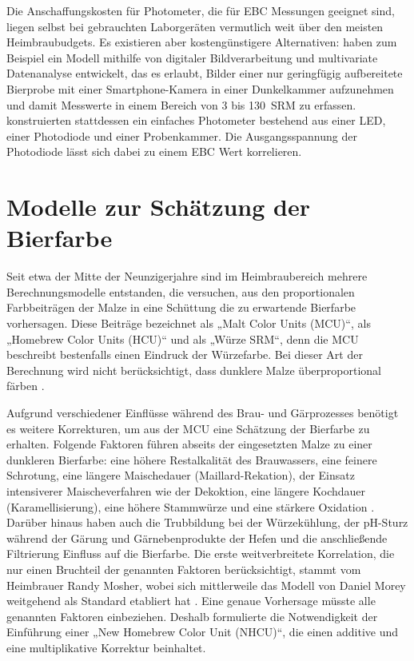 \documentclass[a4paper,parskip=half]{scrartcl}
\begin{document}
Die Anschaffungskosten für Photometer, die für EBC Messungen geeignet sind, liegen selbst bei gebrauchten Laborgeräten vermutlich weit über den meisten Heimbraubudgets. Es existieren aber kostengünstigere Alternativen: \textcite{Fulgencio2019} haben zum Beispiel ein Modell mithilfe von digitaler Bildverarbeitung und multivariate Datenanalyse entwickelt, das es erlaubt, Bilder einer nur geringfügig aufbereitete Bierprobe mit einer Smartphone-Kamera in einer Dunkelkammer aufzunehmen und damit Messwerte in einem Bereich von 3 bis 130~SRM zu erfassen. \textcite{Caro2019} konstruierten stattdessen ein einfaches Photometer bestehend aus einer LED, einer Photodiode und einer Probenkammer. Die Ausgangsspannung der Photodiode lässt sich dabei zu einem EBC Wert korrelieren.

\section*{Modelle zur Schätzung der Bierfarbe}

Seit etwa der Mitte der Neunzigerjahre sind im Heimbraubereich mehrere Berechnungsmodelle entstanden, die versuchen, aus den proportionalen Farbbeiträgen der Malze in eine Schüttung die zu erwartende Bierfarbe vorhersagen. Diese Beiträge bezeichnet \textcite[61]{Daniels1996} als „Malt Color Units (MCU)“, \textcite[34]{Mosher1994} als „Homebrew Color Units (HCU)“  und \textcite[10]{Holle2010} als „Würze SRM“, denn die MCU beschreibt bestenfalls einen Eindruck der Würzefarbe. Bei dieser Art der Berechnung wird nicht berücksichtigt, dass dunklere Malze überproportional färben \parencite{KrausWeyermann2021c}.

Aufgrund verschiedener Einflüsse während des Brau- und Gärprozesses benötigt es weitere Korrekturen, um aus der MCU eine Schätzung der Bierfarbe zu erhalten. Folgende Faktoren führen abseits der eingesetzten Malze zu einer dunkleren Bierfarbe: eine höhere Restalkalität des Brauwassers, eine feinere Schrotung, eine längere Maischedauer (Maillard-Rekation), der Einsatz intensiverer Maischeverfahren wie der Dekoktion, eine längere Kochdauer (Karamellisierung), eine höhere Stammwürze und eine stärkere Oxidation \parencites{KrausWeyermann2021c}[55]{Daniels1996}. Darüber hinaus haben auch die Trubbildung bei der Würzekühlung, der pH-Sturz während der Gärung und Gärnebenprodukte der Hefen und die anschließende Filtrierung Einfluss auf die Bierfarbe. Die erste weitverbreitete Korrelation, die nur einen Bruchteil der genannten Faktoren berücksichtigt, stammt vom Heimbrauer Randy Mosher, wobei sich mittlerweile das Modell von Daniel Morey weitgehend als Standard etabliert hat \parencite{KrausWeyermann2021b}. Eine genaue Vorhersage müsste alle genannten Faktoren einbeziehen. Deshalb formulierte \textcite{Colby2000} die Notwendigkeit der Einführung einer „New Homebrew Color Unit (NHCU)“, die einen additive und eine multiplikative Korrektur beinhaltet.
\end{document}
